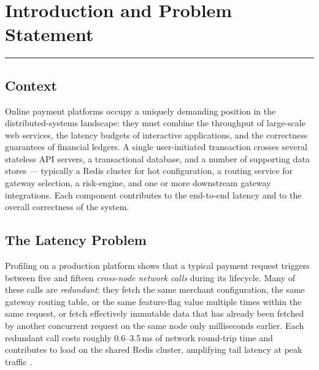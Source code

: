 \documentclass[12pt,a4paper,oneside]{report}
\begin{document}
\tableofcontents
\clearpage
\listoffigures
\clearpage
\listoftables
\clearpage

\setcounter{page}{1}

\chapter[Introduction]{Introduction and Problem Statement}
\label{chap:intro}
\vspace{-1cm}
\noindent \rule{6.6in}{0.01in}

\section{Context}
Online payment platforms occupy a uniquely demanding position in the distributed-systems landscape: they must combine the throughput of large-scale web services, the latency budgets of interactive applications, and the correctness guarantees of financial ledgers. A single user-initiated transaction crosses several stateless API servers, a transactional database, and a number of supporting data stores --- typically a Redis cluster for hot configuration, a routing service for gateway selection, a risk-engine, and one or more downstream gateway integrations. Each component contributes to the end-to-end latency and to the overall correctness of the system.

\section{The Latency Problem}
Profiling on a production platform shows that a typical payment request triggers between five and fifteen \emph{cross-node network calls} during its lifecycle. Many of these calls are \emph{redundant}: they fetch the same merchant configuration, the same gateway routing table, or the same feature-flag value multiple times within the same request, or fetch effectively immutable data that has already been fetched by another concurrent request on the same node only milliseconds earlier. Each redundant call costs roughly 0.6--3.5\,ms of network round-trip time and contributes to load on the shared Redis cluster, amplifying tail latency at peak traffic \cite{kumar2024caching, qin2024tailcache}.
\end{document}
